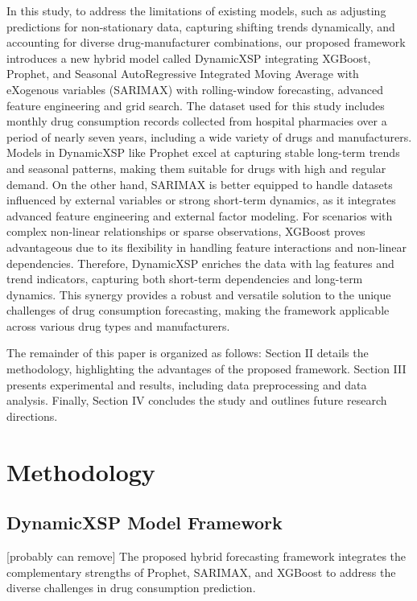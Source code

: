 \documentclass[journal]{IEEEtran}
\begin{document}
In this study, to address the limitations of existing models, such as adjusting predictions for non-stationary data, capturing shifting trends dynamically, and accounting for diverse drug-manufacturer combinations, our proposed framework introduces a new hybrid model called DynamicXSP integrating XGBoost, Prophet, and Seasonal AutoRegressive Integrated Moving Average with eXogenous variables (SARIMAX) with rolling-window forecasting, advanced feature engineering and grid search. The dataset used for this study includes monthly drug consumption records collected from hospital pharmacies over a period of nearly seven years, including a wide variety of drugs and manufacturers. Models in DynamicXSP like Prophet excel at capturing stable long-term trends and seasonal patterns, making them suitable for drugs with high and regular demand. On the other hand, SARIMAX is better equipped to handle datasets influenced by external variables or strong short-term dynamics, as it integrates advanced feature engineering and external factor modeling. For scenarios with complex non-linear relationships or sparse observations, XGBoost proves advantageous due to its flexibility in handling feature interactions and non-linear dependencies. Therefore, DynamicXSP enriches the data with lag features and trend indicators, capturing both short-term dependencies and long-term dynamics. This synergy provides a robust and versatile solution to the unique challenges of drug consumption forecasting, making the framework applicable across various drug types and manufacturers.

The remainder of this paper is organized as follows: Section II details the methodology, highlighting the advantages of the proposed framework. Section III presents experimental and results, including data preprocessing and data analysis. Finally, Section IV concludes the study and outlines future research directions.

\section{Methodology}

\subsection{DynamicXSP Model Framework}

[probably can remove] The proposed hybrid forecasting framework integrates the complementary strengths of Prophet, SARIMAX, and XGBoost to address the diverse challenges in drug consumption prediction.
\end{document}
